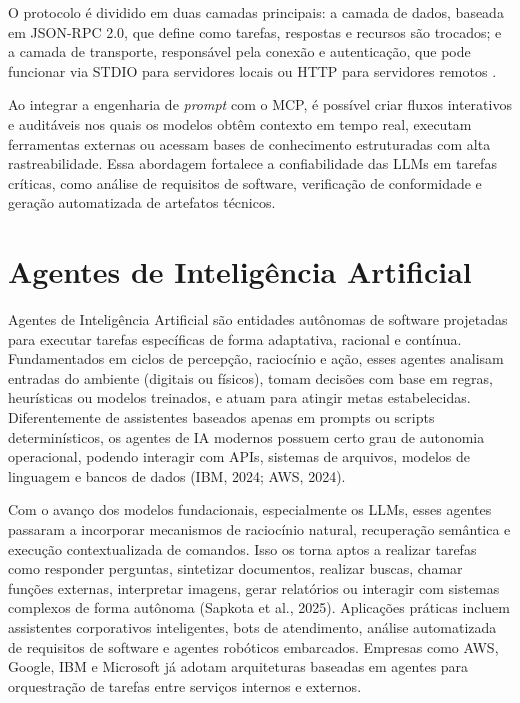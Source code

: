 O protocolo é dividido em duas camadas principais: a camada de dados, baseada em JSON-RPC 2.0, que define como tarefas, respostas e recursos são trocados; e a camada de transporte, responsável pela conexão e autenticação, que pode funcionar via STDIO para servidores locais ou HTTP para servidores remotos .

Ao integrar a engenharia de \textit{prompt} com o MCP, é possível criar fluxos interativos e auditáveis nos quais os modelos obtêm contexto em tempo real, executam ferramentas externas ou acessam bases de conhecimento estruturadas com alta rastreabilidade. Essa abordagem fortalece a confiabilidade das LLMs em tarefas críticas, como análise de requisitos de software, verificação de conformidade e geração automatizada de artefatos técnicos.


\section{Agentes de Inteligência Artificial}


Agentes de Inteligência Artificial são entidades autônomas de software projetadas para executar tarefas específicas de forma adaptativa, racional e contínua. Fundamentados em ciclos de percepção, raciocínio e ação, esses agentes analisam entradas do ambiente (digitais ou físicos), tomam decisões com base em regras, heurísticas ou modelos treinados, e atuam para atingir metas estabelecidas. Diferentemente de assistentes baseados apenas em prompts ou scripts determinísticos, os agentes de IA modernos possuem certo grau de autonomia operacional, podendo interagir com APIs, sistemas de arquivos, modelos de linguagem e bancos de dados (IBM, 2024; AWS, 2024).

Com o avanço dos modelos fundacionais, especialmente os LLMs, esses agentes passaram a incorporar mecanismos de raciocínio natural, recuperação semântica e execução contextualizada de comandos. Isso os torna aptos a realizar tarefas como responder perguntas, sintetizar documentos, realizar buscas, chamar funções externas, interpretar imagens, gerar relatórios ou interagir com sistemas complexos de forma autônoma (Sapkota et al., 2025). Aplicações práticas incluem assistentes corporativos inteligentes, bots de atendimento, análise automatizada de requisitos de software e agentes robóticos embarcados. Empresas como AWS, Google, IBM e Microsoft já adotam arquiteturas baseadas em agentes para orquestração de tarefas entre serviços internos e externos.

